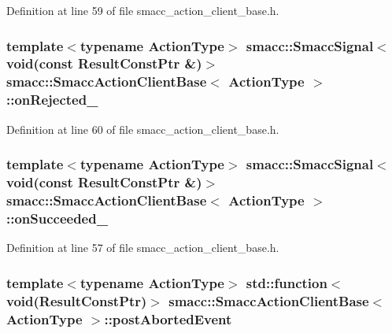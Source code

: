 Definition at line 59 of file smacc\+\_\+action\+\_\+client\+\_\+base.\+h.

\subsubsection[{\texorpdfstring{on\+Rejected\+\_\+}{onRejected_}}]{\setlength{\rightskip}{0pt plus 5cm}template$<$typename Action\+Type$>$ {\bf smacc\+::\+Smacc\+Signal}$<$void(const Result\+Const\+Ptr \&)$>$ {\bf smacc\+::\+Smacc\+Action\+Client\+Base}$<$ Action\+Type $>$\+::on\+Rejected\+\_\+}\hypertarget{classsmacc_1_1SmaccActionClientBase_a5c45413657d82e9505537df51b764c41}{}\label{classsmacc_1_1SmaccActionClientBase_a5c45413657d82e9505537df51b764c41}


Definition at line 60 of file smacc\+\_\+action\+\_\+client\+\_\+base.\+h.

\subsubsection[{\texorpdfstring{on\+Succeeded\+\_\+}{onSucceeded_}}]{\setlength{\rightskip}{0pt plus 5cm}template$<$typename Action\+Type$>$ {\bf smacc\+::\+Smacc\+Signal}$<$void(const Result\+Const\+Ptr \&)$>$ {\bf smacc\+::\+Smacc\+Action\+Client\+Base}$<$ Action\+Type $>$\+::on\+Succeeded\+\_\+}\hypertarget{classsmacc_1_1SmaccActionClientBase_aca976e0c55e96165fdc0eb6df7919d58}{}\label{classsmacc_1_1SmaccActionClientBase_aca976e0c55e96165fdc0eb6df7919d58}


Definition at line 57 of file smacc\+\_\+action\+\_\+client\+\_\+base.\+h.

\subsubsection[{\texorpdfstring{post\+Aborted\+Event}{postAbortedEvent}}]{\setlength{\rightskip}{0pt plus 5cm}template$<$typename Action\+Type$>$ std\+::function$<$void(Result\+Const\+Ptr)$>$ {\bf smacc\+::\+Smacc\+Action\+Client\+Base}$<$ Action\+Type $>$\+::post\+Aborted\+Event}\hypertarget{classsmacc_1_1SmaccActionClientBase_ae0ec1c3fcea9712b35bc09686687c251}{}\label{classsmacc_1_1SmaccActionClientBase_ae0ec1c3fcea9712b35bc09686687c251}



